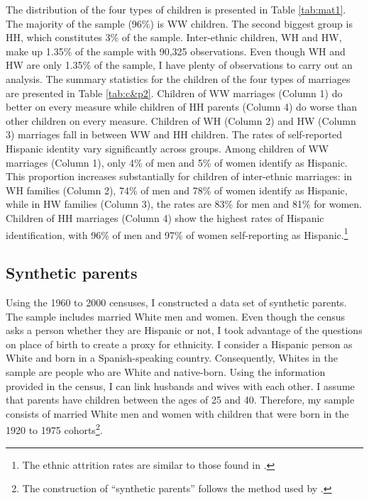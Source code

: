 The distribution of the four types of children is presented in Table \ref{tab:mat1}. The majority of the sample (96\%) is WW children. The second biggest group is HH, which constitutes 3\% of the sample. Inter-ethnic children, WH and HW, make up 1.35\% of the sample with 90,325 observations. Even though WH and HW are only 1.35\% of the sample, I have plenty of observations to carry out an analysis. The summary statistics for the children of the four types of marriages are presented in Table \ref{tab:c&p2}. Children of WW marriages (Column 1) do better on every measure while children of HH parents (Column 4) do worse than other children on every measure. Children of WH (Column 2) and HW (Column 3) marriages fall in between WW and HH children. The rates of self-reported Hispanic identity vary significantly across groups. Among children of WW marriages (Column 1), only 4\% of men and 5\% of women identify as Hispanic. This proportion increases substantially for children of inter-ethnic marriages: in WH families (Column 2), 74\% of men and 78\% of women identify as Hispanic, while in HW families (Column 3), the rates are 83\% for men and 81\% for women. Children of HH marriages (Column 4) show the highest rates of Hispanic identification, with 96\% of men and 97\% of women self-reporting as Hispanic.\footnote{The ethnic attrition rates are similar to those found in \textcite{antmanEthnicAttritionObserved2016,antmanEthnicAttritionAssimilation2020, hadah2024effect}.}
 
\subsection{Synthetic parents}

Using the 1960 to 2000 censuses, I constructed a data set of synthetic parents. The sample includes married White men and women. Even though the census asks a person whether they are Hispanic or not, I took advantage of the questions on place of birth to create a proxy for ethnicity. I consider a Hispanic person as White and born in a Spanish-speaking country. Consequently, Whites in the sample are people who are White and native-born. Using the information provided in the census, I can link husbands and wives with each other. I assume that parents have children between the ages of 25 and 40. Therefore, my sample consists of married White men and women with children that were born in the 1920 to 1975 cohorts\footnote{The construction of ``synthetic parents'' follows the method used by \textcite{rubinstein2014pride}.}.

